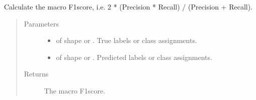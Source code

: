 \documentclass[letterpaper,10pt,english]{sphinxmanual}
\begin{document}
\begin{fulllineitems}
\label{\detokenize{pusion.evaluation.evaluation_metrics:pusion.evaluation.evaluation_metrics.macro_f1}}
\sphinxAtStartPar
Calculate the macro F1\sphinxhyphen{}score, i.e. 2 * (Precision * Recall) / (Precision + Recall).
\begin{quote}\begin{description}
\item[{Parameters}] \leavevmode\begin{itemize}
\item {} 
\sphinxAtStartPar
{} \textendash{}  of shape  or . True labels or class assignments.

\item {} 
\sphinxAtStartPar
{} \textendash{}  of shape  or . Predicted labels or
class assignments.

\end{itemize}

\item[{Returns}] \leavevmode
\sphinxAtStartPar
The macro F1\sphinxhyphen{}score.

\end{description}\end{quote}

\end{fulllineitems}

\end{document}
